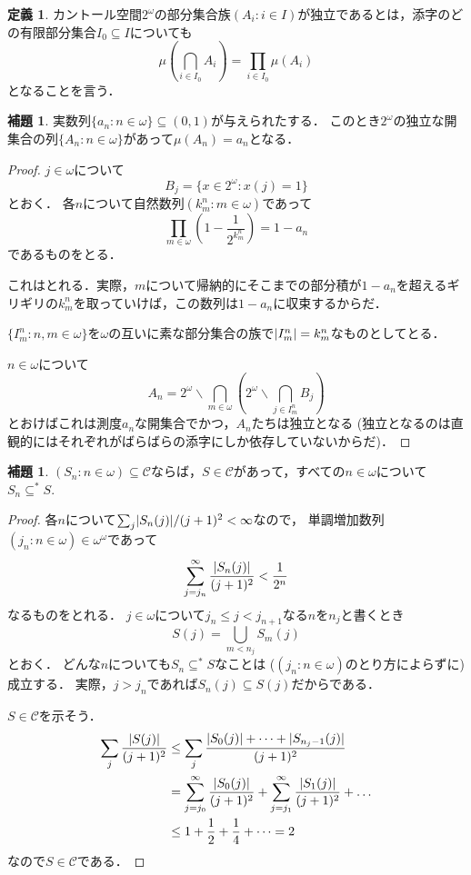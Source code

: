 \documentclass[uplatex,dvipdfmx]{jsarticle}
\newcommand{\scrC}{\mathcal{C}}
\DeclarePairedDelimiter\abs{\lvert}{\rvert}
\renewcommand\subset{\subseteq}
\renewcommand{\setminus}{\smallsetminus}
\theoremstyle{definition}
\newtheorem{defi}[thm]{定義}
\newtheorem{lem}[thm]{補題}
\theoremstyle{named}
\newenvironment{reason}
{
	\begin{mdframed}[backgroundcolor=reasonbg,linewidth=0]
		\color{reasontext}
		\small
	}
	{
	\end{mdframed}
}
\begin{document}
	\begin{defi}
		カントール空間$2^\omega$の部分集合族$(A_i : i \in I)$が独立であるとは，添字のどの有限部分集合$I_0 \subset I$についても
		\[
			\mu(\bigcap_{i \in I_0} A_i) = \prod_{i \in I_0} \mu(A_i)
		\]
		となることを言う．
	\end{defi}
	
	\begin{lem}
		実数列$\{ a_n : n \in \omega \} \subset (0, 1)$が与えられたする．
		このとき$2^\omega$の独立な開集合の列$\{A_n : n \in \omega \}$があって$\mu(A_n)  = a_n$となる．
	\end{lem}
	\begin{proof}
		$j \in \omega$について
		\[
			B_j = \{ x \in 2^\omega : x(j) = 1\}
		\]
		とおく．
		各$n$について自然数列$(k^n_m : m \in \omega)$であって
		\[
		\prod_{m \in \omega} \left(1 - \frac{1}{2^{k^n_m}}\right) = 1 - a_n
		\]
		であるものをとる．
		\begin{reason}
			これはとれる．実際，$m$について帰納的にそこまでの部分積が$1-a_n$を超えるギリギリの$k^n_m$を取っていけば，この数列は$1 - a_n$に収束するからだ．
		\end{reason}
	
		$\{ I^n_m : n, m \in \omega \}$を$\omega$の互いに素な部分集合の族で$\abs{I^n_m} = k^n_m$なものとしてとる．
		
		$n \in \omega$について
		\[
		A_n = 2^\omega \setminus \bigcap_{m \in \omega} (2^\omega \setminus \bigcap_{j \in I^n_m} B_j )
		\]
		とおけばこれは測度$a_n$な開集合でかつ，$A_n$たちは独立となる
		(独立となるのは直観的にはそれぞれがばらばらの添字にしか依存していないからだ)．
	\end{proof}


	\begin{lem}\label{coverctbl}
		$(S_n : n \in \omega) \subset \scrC$ならば，$S \in \scrC$があって，すべての$n \in \omega$について$S_n \subset^* S$.	
	\end{lem}
	\begin{proof}
		各$n$について$\sum_j \abs{S_n(j)}/(j + 1)^2 < \infty$なので，
		単調増加数列$(j_n : n \in \omega) \in \omega^\omega$であって
		\[
			\sum_{j = j_n}^\infty \frac{\abs{S_n(j)}}{(j+1)^2} < \frac{1}{2^n}
		\]
		なるものをとれる．
		$j \in \omega$について$j_n \le j < j_{n+1}$なる$n$を$n_j$と書くとき
		\[
		S(j) = \bigcup_{m < n_j} S_m(j)
		\]
		とおく．
		どんな$n$についても$S_n \subset^* S$なことは ($(j_n : n \in \omega)$のとり方によらずに)成立する．
		実際，$j > j_n$であれば$S_n(j) \subset S(j)$だからである．
		
		$S \in \scrC$を示そう．
		\begin{align*}
			\sum_j \frac{\abs{S(j)}}{(j+1)^2}
			&\le \sum_j \frac{\abs{S_0(j)} + \dots + \abs{S_{n_j - 1}(j)}}{(j+1)^2} \\
			&= \sum_{j=j_0}^\infty \frac{\abs{S_0(j)}}{(j+1)^2} + \sum_{j=j_1}^\infty \frac{\abs{S_1(j)}}{(j+1)^2} + \dots \\
			&\le 1 + \frac12 + \frac14 + \dots = 2
		\end{align*}
		なので$S \in \scrC$である．
	\end{proof}
\end{document}
